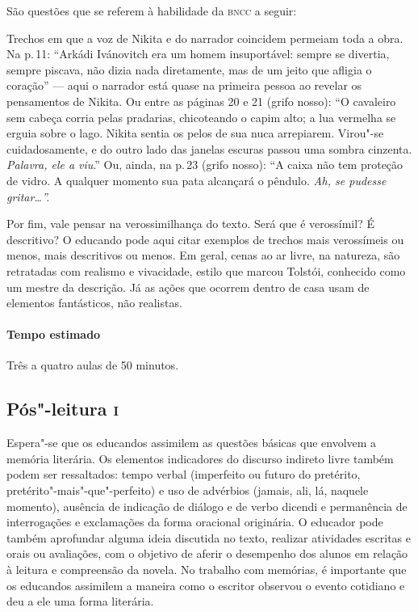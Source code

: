 \documentclass[11pt]{extarticle}
\begin{document}
\begin{enumerate}
São questões que se referem à habilidade da \textsc{bncc} a seguir:

Trechos em que a voz de Nikita e do narrador coincidem permeiam toda a
obra. Na p.\,11: ``Arkádi Ivánovitch era um homem insuportável: sempre se
divertia, sempre piscava, não dizia nada diretamente, mas de um jeito
que afligia o coração'' --- aqui o narrador está quase na primeira
pessoa ao revelar os pensamentos de Nikita. Ou entre as páginas 20 e 21
(grifo nosso): ``O cavaleiro sem cabeça corria pelas pradarias,
chicoteando o capim alto; a lua vermelha se erguia sobre o lago. Nikita
sentia os pelos de sua nuca arrepiarem. Virou"-se cuidadosamente, e do
outro lado das janelas escuras passou uma sombra cinzenta.
\emph{Palavra, ele a viu}.'' Ou, ainda, na p.\,23 (grifo nosso): ``A
caixa não tem proteção de vidro. A qualquer momento sua pata alcançará o
pêndulo. \emph{Ah, se pudesse gritar\ldots{}''.}

Por fim, vale pensar na verossimilhança do texto. Será que é
verossímil? É descritivo? O educando pode aqui citar exemplos de trechos
mais verossímeis ou menos, mais descritivos ou menos. Em geral, cenas ao
ar livre, na natureza, são retratadas com realismo e vivacidade, estilo
que marcou Tolstói, conhecido como um mestre da descrição. Já as ações
que ocorrem dentro de casa usam de elementos fantásticos, não realistas.
\end{enumerate}

\paragraph{Tempo estimado} Três a quatro aulas de 50 minutos.

\subsection{Pós"-leitura \textsc{i}}

Espera"-se que os educandos assimilem as questões básicas que envolvem
a memória literária. Os elementos indicadores do discurso indireto livre
também podem ser ressaltados: tempo verbal (imperfeito ou futuro do
pretérito, pretérito"-mais"-que"-perfeito) e uso de advérbios (jamais, ali,
lá, naquele momento), ausência de indicação de diálogo e de verbo
dicendi e permanência de interrogações e exclamações da forma oracional
originária. O educador pode também aprofundar alguma ideia discutida no
texto, realizar atividades escritas e orais ou avaliações, com o
objetivo de aferir o desempenho dos alunos em relação à leitura e
compreensão da novela. No trabalho com memórias, é importante que os
educandos assimilem a maneira como o escritor observou o evento
cotidiano e deu a ele uma forma literária.
\end{document}
